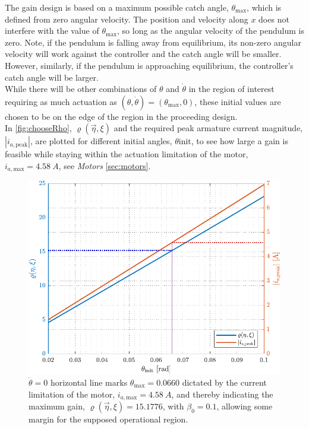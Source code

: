 %
The gain design is based on a maximum possible catch angle, $\theta_\mathrm{max}$, which is defined from zero angular velocity. The position and velocity along $x$ does not interfere with the value of $\theta_\mathrm{max}$, so long as the angular velocity of the pendulum is zero. Note, if the pendulum is falling away from equilibrium, its non-zero angular velocity will work against the controller and the catch angle will be smaller. However, similarly, if the pendulum is approaching equilibrium, the controller's catch angle will be larger.\\
While there will be other combinations of $\theta$ and $\dot{\theta}$ in the region of interest requiring as much actuation as $(\theta,\dot{\theta})=(\theta_\mathrm{max},0)$, these initial values are chosen to be on the edge of the region in the proceeding design.\\
In \autoref{fig:chooseRho}, $\varrho(\vec{\eta},\xi)$ and the required peak armature current magnitude, $|i_{a,\mathrm{peak}}|$, are plotted for different initial angles, $\theta\mathrm{init}$, to see how large a gain is feasible while staying within the actuation limitation of the motor, $i_{a,\mathrm{max}} = \SI{4.58}{A}$, see \textit{Motors} \autoref{sec:motors}.
%
\begin{figure}[H]
  \includegraphics[width=.75\textwidth]{figures/chooseRho}
  \caption{$\dot{\theta}=0$ horizontal line marks $\theta_\mathrm{max} = 0.0660$ dictated by the current limitation of the motor, $i_{a,\mathrm{max}} = \SI{4.58}{A}$, and thereby indicating the maximum gain, $\varrho(\vec{\eta},\xi) = 15.1776$, with $\beta_0=0.1$, allowing some margin for the supposed operational region.}
  \label{fig:chooseRho}
\end{figure}




